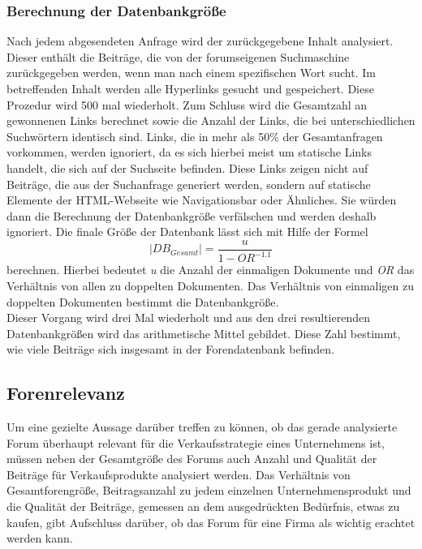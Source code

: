 \subsubsection{Berechnung der Datenbankgröße}
Nach jedem abgesendeten Anfrage wird der zurückgegebene Inhalt analysiert. Dieser enthält die Beiträge, die von der 
forumseigenen Suchmaschine zurückgegeben werden, wenn man nach einem spezifischen Wort sucht. Im betreffenden Inhalt werden alle Hyperlinks gesucht und gespeichert. Diese Prozedur wird 500 mal wiederholt. Zum Schluss wird die Gesamtzahl an gewonnenen Links berechnet sowie die Anzahl der Links, die bei unterschiedlichen Suchwörtern identisch sind. Links, die in mehr als 50\% der Gesamtanfragen vorkommen, werden ignoriert, da es sich hierbei meist um statische Links handelt, die sich auf der Suchseite befinden. Diese Links zeigen nicht auf Beiträge, die aus der Suchanfrage generiert werden, sondern auf statische Elemente der HTML-Webseite wie Navigationsbar oder Ähnliches. Sie würden dann die Berechnung der Datenbankgröße verfälschen und werden deshalb ignoriert.
Die finale Größe der Datenbank lässt sich mit Hilfe der Formel \[|DB_{Gesamt}| = \frac{u}{1-OR^{-1.1}}\] berechnen. Hierbei bedeutet \textit{u} die Anzahl der einmaligen Dokumente und \textit{OR} das Verhältnis von allen zu doppelten Dokumenten. Das Verhältnis von einmaligen zu doppelten Dokumenten bestimmt die Datenbankgröße\cite{lu2008efficient}.\\
Dieser Vorgang wird drei Mal wiederholt und aus den drei resultierenden Datenbankgrößen wird das arithmetische Mittel gebildet. Diese Zahl bestimmt, wie viele Beiträge sich insgesamt in der Forendatenbank befinden.



\subsection{Forenrelevanz}
Um eine gezielte Aussage darüber treffen zu können, ob das gerade analysierte Forum überhaupt relevant für die Verkaufsstrategie eines Unternehmens ist, müssen neben der Gesamtgröße des Forums auch Anzahl und Qualität der Beiträge für Verkaufsprodukte analysiert werden. Das Verhältnis von Gesamtforengröße, Beitragsanzahl zu jedem einzelnen Unternehmensprodukt und die Qualität der Beiträge, gemessen an dem ausgedrückten Bedürfnis, etwas zu kaufen, gibt Aufschluss darüber, ob das Forum für eine Firma als wichtig erachtet werden kann.

